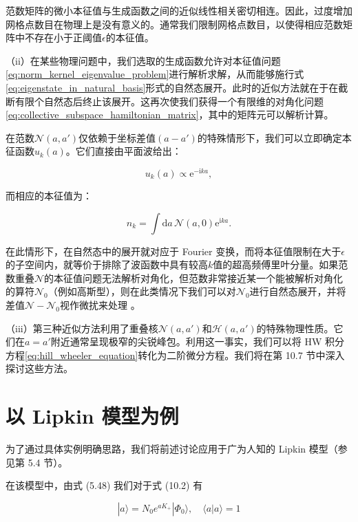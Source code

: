 范数矩阵的微小本征值与生成函数之间的近似线性相关密切相连。因此，过度增加网格点数目在物理上是没有意义的。通常我们限制网格点数目，以使得相应范数矩阵中不存在小于正阈值$\epsilon$的本征值。

（ii）在某些物理问题中，我们选取的生成函数允许对本征值问题\ref{eq:norm_kernel_eigenvalue_problem}进行解析求解，从而能够施行式\ref{eq:eigenstate_in_natural_basis}形式的自然态展开。此时的近似方法就在于在截断有限个自然态后终止该展开。这再次使我们获得一个有限维的对角化问题\ref{eq:collective_subspace_hamiltonian_matrix}，其中的矩阵元可以解析计算。

在范数$\mathscr{N}(a,a')$仅依赖于坐标差值$(a-a')$的特殊情形下，我们可以立即确定本征函数$u_{k}(a)$。它们直接由平面波给出：

\begin{equation}
u_{k}(a)\propto\mathrm{e}^{-\mathrm{i}ka},\label{eq:translation_invariant_norm_eigenfunction}
\end{equation}

而相应的本征值为：

\begin{equation}
n_{k}=\int\mathrm{d}a\,\mathscr{N}(a,0)\mathrm{e}^{\mathrm{i}ka}.\label{eq:translation_invariant_norm_eigenvalue}
\end{equation}

在此情形下，在自然态中的展开就对应于 Fourier 变换，而将本征值限制在大于$\epsilon$的子空间内，就等价于排除了波函数中具有较高$k$值的超高频傅里叶分量。如果范数重叠$\mathscr{N}$的本征值问题无法解析对角化，但范数非常接近某一个能被解析对角化的算符$\mathscr{N}_{0}$（例如高斯型），则在此类情况下我们可以对$\mathscr{N}_{0}$进行自然态展开，并将差值$\mathscr{N}-\mathscr{N}_{0}$视作微扰来处理
\cite{LL77}。

（iii）第三种近似方法利用了重叠核$\mathscr{N}(a,a')$和$\mathscr{H}(a,a')$的特殊物理性质。它们在$a=a'$附近通常呈现极窄的尖锐峰包。利用这一事实，我们可以将
HW 积分方程\ref{eq:hill_wheeler_equation}转化为二阶微分方程。我们将在第 10.7 节中深入探讨这些方法。

\section{以 Lipkin 模型为例}

为了通过具体实例明确思路，我们将前述讨论应用于广为人知的 Lipkin 模型（参见第 5.4 节）。

在该模型中，由式 (5.48) 我们对于式 (10.2) 有

\begin{equation}
|a\rangle=N_{0}e^{aK_{+}}|\Phi_{0}\rangle,\quad\langle a|a\rangle=1\label{eq:lipkin_generating_state}
\end{equation}

